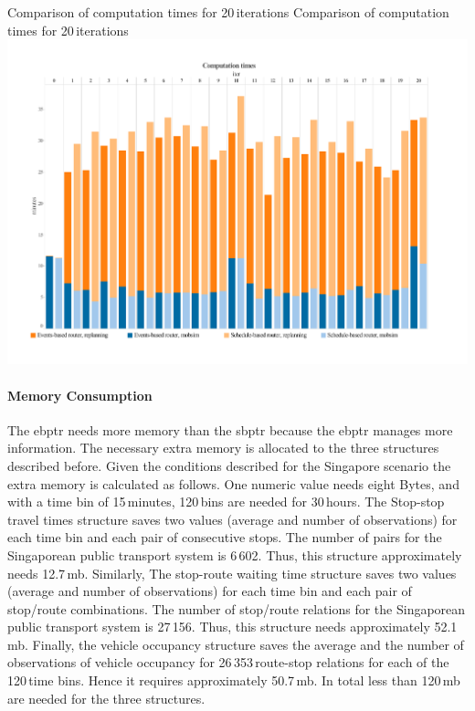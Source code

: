 \createfigure
{Comparison of computation times for 20\,iterations}
{Comparison of computation times for 20\,iterations}
{\label{fig:CompTimes}}
{\includegraphics[width=1.0\textwidth]{extending/figures/ebr/ComputationTimes.pdf}}
{}

\paragraph{Memory Consumption}

The \gls{ebptr} needs more memory than the \gls{sbptr} because the \gls{ebptr} manages more information. The necessary extra memory is allocated to the three structures described before. Given the conditions described for the Singapore scenario the extra memory is calculated as follows. One numeric value needs eight Bytes, and with a time bin of 15\,minutes, 120\,bins are needed for 30\,hours. The Stop-stop travel times structure saves two values (average and number of observations) for each time bin and each pair of consecutive stops. The number of pairs for the Singaporean public transport system is 6\,602. Thus, this structure approximately needs 12.7\,\gls{mb}. Similarly, The stop-route waiting time structure saves two values (average and number of observations) for each time bin and each pair of stop/route combinations. The number of stop/route relations for the Singaporean public transport system is 27\,156. Thus, this structure needs approximately 52.1\,\gls{mb}. Finally, the vehicle occupancy structure saves the average and the number of observations of vehicle occupancy for 26\,353\,route-stop relations for each of the 120\,time bins. Hence it requires approximately 50.7\,\gls{mb}. In total less than 120\,\gls{mb} are needed for the three structures.

